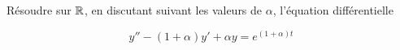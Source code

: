 R{\'e}soudre sur $\mathbb{R}$, en discutant suivant les valeurs de
$\alpha$, l'{\'e}quation diff{\'e}rentielle

\[y''-(1+\alpha)y'+\alpha y = e^{(1+\alpha) t}\]
